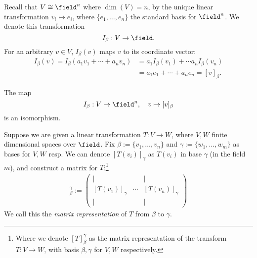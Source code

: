 \begin{remark}
    Recall that $V \cong \field^n$ where $\dim(V) = n$, by the unique linear transformation $v_i \mapsto e_i$, where $\{e_1, \dots, e_n\}$ the standard basis for $\field^n$. We denote this transformation $$I_\beta : V \to \field.$$ For an arbitrary $v \in V$, $I_\beta (v)$ maps $v$ to its coordinate vector:
    \begin{align*}
        I_\beta(v) = I_\beta(a_1v_1  + \cdots + a_n v_n) &= a_1 I_\beta(v_1) + \cdots a_n I_\beta(v_n)\\
        &= a_1 e_1 + \cdots + a_n e_n = [v]_\beta.
    \end{align*}
\end{remark}

\begin{proposition}
The map $$I_\beta : V \to \field^n, \quad v \mapsto [v]_\beta$$ is an isomorphism.
\end{proposition}

Suppose we are given a linear transformation $T : V \to W$, where $V, W$ finite dimensional spaces over $\field$. Fix $\beta := \{v_1, \dots, v_n\}$ and $\gamma := \{w_1, \dots, w_m\}$ as bases for $V, W$ resp. We can denote $[T(v_i)]_\gamma$ as $T(v_i)$ in base $\gamma$ (in the field $m$), and construct a matrix for $T$:\footnote{Where we denote $[T]_\beta^\gamma$ as the matrix representation of the transform $T: V \to W$, with basis $\beta, \gamma$ for $V, W$ respectively.}
\begin{align*}
    [T]_\beta^\gamma := \begin{pmatrix}
        \vert & & \vert\\
        [T(v_1)]_\gamma & \cdots & [T(v_n)]_\gamma\\
        \vert& & \vert
    \end{pmatrix}
\end{align*}
We call this the \emph{matrix representation} of $T$ from $\beta$ to $\gamma$.

